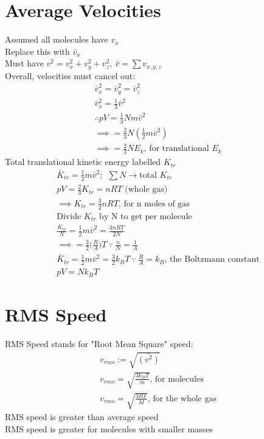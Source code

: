 \documentclass[a4paper, 11pt, fleqn, normalem]{report}
\begin{document}
\section{Average Velocities}
Assumed all molecules have $v_{x}$ \\
Replace this with $\bar{v}_{x}$ \\
Must have $v^{2} = v_{x}^{2} + v_{y}^{2} + v_{z}^{2},~ \bar{v} = \sum v_{x,y,z}$ \\
Overall, velocities must cancel out:
\begin{gather*}
	\bar{v}_{x}^{2} = \bar{v}_{y}^{2} = \bar{v}_{z}^{2} \\
	\bar{v}_{x}^{2} = \frac{1}{3}\bar{v}^{2} \\
	\therefore pV = \frac{1}{3}Nm\bar{v}^{2} \\
	\implies = \frac{2}{3}N(\frac{1}{2}m\bar{v}^{2}) \\
	\implies = \frac{2}{3}NE_{k} \text{, for translational }E_{k}
\end{gather*}
Total translational kinetic energy labelled $K_{tr}$
\begin{gather*}
	\bar{K}_{tr} = \frac{1}{2}m\bar{v}^{2};~~ \sum N \rightarrow \text{total }K_{tr} \\
	pV = \frac{2}{3}K_{tr} = nRT \text{ (whole gas)} \\
	\implies K_{tr} = \frac{3}{2}nRT\text{, for n moles of gas} \\
	\text{Divide }K_{tr}\text{ by N to get per molecule} \\
	\frac{K_{tr}}{N} = \frac{1}{2}m\bar{v}^{2} = \frac{3nRT}{2N} \\
	\implies = \frac{3}{2}\Big(\frac{R}{A}\Big)T ~\because~ \frac{n}{N} = \frac{1}{A} \\
	\bar{K}_{tr} = \frac{1}{2}m\bar{v}^{2} = \frac{3}{2}k_{B}T ~\because~ \frac{R}{A} = k_{B}\text{, the Boltzmann constant} \\
	pV = Nk_{B}T
\end{gather*}
\section{RMS Speed}
RMS Speed stands for "Root Mean Square" speed:
\begin{gather*}
	v_{rms} := \sqrt{\bar{(v^{2})}} \\
	v_{rms} = \sqrt{\frac{3k_{B}T}{m}}\text{, for molecules} \\
	v_{rms} = \sqrt{\frac{3RT}{M}}\text{, for the whole gas}
\end{gather*}
RMS speed is greater than average speed \\
RMS speed is greater for molecules with smaller masses
\end{document}
